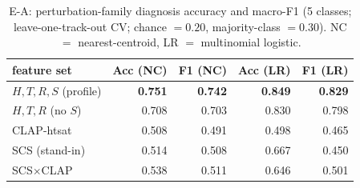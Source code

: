 \begin{table}[t]
\centering
\caption[Diagnosing which perturbation occurred]{E-A: perturbation-family diagnosis accuracy and macro-F1 (5 classes; leave-one-track-out CV; chance $=0.20$, majority-class $=0.30$). NC $=$ nearest-centroid, LR $=$ multinomial logistic.}
\label{tab:diagnosis}
\begin{tabular}{lrrrr}
\toprule
feature set & Acc (NC) & F1 (NC) & Acc (LR) & F1 (LR) \\
\midrule
$H,T,R,S$ (profile) & \textbf{0.751} & \textbf{0.742} & \textbf{0.849} & \textbf{0.829} \\
$H,T,R$ (no $S$) & 0.708 & 0.703 & 0.830 & 0.798 \\
\midrule
CLAP-htsat & 0.508 & 0.491 & 0.498 & 0.465 \\
SCS (stand-in) & 0.514 & 0.508 & 0.667 & 0.450 \\
SCS$\times$CLAP & 0.538 & 0.511 & 0.646 & 0.501 \\
\bottomrule
\end{tabular}
\end{table}

